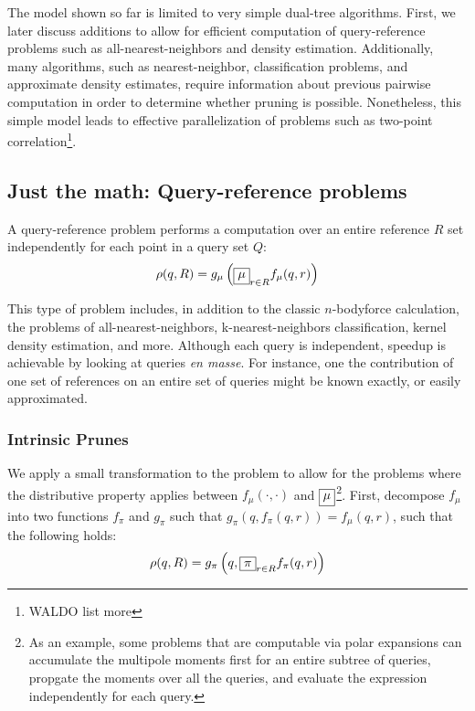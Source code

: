 \documentclass[times, 10pt,twocolumn]{article}
\newcommand{\nbody}{$n$-body}
\newcommand{\Oppi}{\fbox{$\pi$}}
\newcommand{\fpi}{f_{\pi}}
\newcommand{\gpi}{g_{\pi}}
\newcommand{\allrho}{\rho}
\newcommand{\Opmu}{\fbox{$\mu$}}
\newcommand{\fmu}{f_{\mu}}
\newcommand{\gmu}{g_{\mu}}
\begin{document}
The model shown so far is limited to very simple dual-tree algorithms.
First, we later discuss additions to allow for efficient computation of query-reference problems such as all-nearest-neighbors and density estimation.
Additionally, many algorithms, such as nearest-neighbor, classification problems, and approximate density estimates, require information about previous pairwise computation in order to determine whether pruning is possible.
Nonetheless, this simple model leads to effective parallelization of problems such as two-point correlation\footnote{WALDO list more}.

\subsection{Just the math: Query-reference problems}

A query-reference problem performs a computation over an entire reference $R$ set independently for each point in a query set $Q$:
\begin{equation}
\allrho(q, R) = \gmu \left( \Opmu_{r \in R} \fmu (q, r) \right)
\end{equation}

\noindent This type of problem includes, in addition to the classic \nbody force calculation, the problems of all-nearest-neighbors, k-nearest-neighbors classification, kernel density estimation, and more.
Although each query is independent, speedup is achievable by looking at queries {\it en masse}.
For instance, one the contribution of one set of references on an entire set of queries might be known exactly, or easily approximated.

\subsubsection{Intrinsic Prunes}

We apply a small transformation to the problem to allow for the problems where the distributive property applies between $\fmu(\cdot, \cdot)$ and $\Opmu$\footnote{As an example, some problems that are computable via polar expansions can accumulate the multipole moments first for an entire subtree of queries, propgate the moments over all the queries, and evaluate the expression independently for each query.}.
First, decompose $\fmu$ into two functions $\fpi$ and $\gpi$ such that $\gpi(q, \fpi(q, r)) = \fmu(q, r)$, such that the following holds:
\begin{equation}
\allrho(q, R) = \gpi \left(q, \Oppi_{r \in R} \fpi(q, r) \right)
\end{equation}
\end{document}
